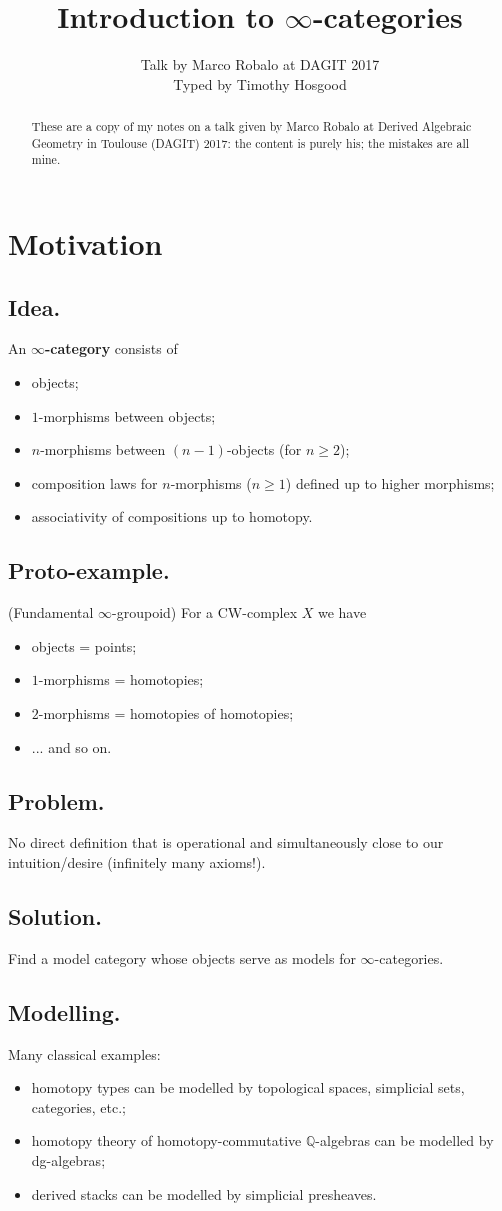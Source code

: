 \documentclass{article}
\title{Introduction to $\infty$-categories}
\author{Talk by Marco Robalo at DAGIT 2017\\Typed by Timothy Hosgood}
\date{\displaydate{date}}
\numberwithin{equation}{subsection}
\renewcommand{\ss}[1]{\subsection{#1}}
\begin{document}
    \maketitle

    \begin{abstract}
        These are a copy of my notes on a talk given by Marco Robalo at Derived Algebraic Geometry in Toulouse (DAGIT) 2017: the content is purely his; the mistakes are all mine.
    \end{abstract}

    \section{Motivation}

        \ss{Idea.}
            An \textbf{$\infty$-category} consists of
            \begin{itemize}
                \item objects;
                \item $1$-morphisms between objects;
                \item $n$-morphisms between $(n-1)$-objects (for $n\geqslant2$);
                \item composition laws for $n$-morphisms ($n\geqslant1$) defined up to higher morphisms;
                \item associativity of compositions up to homotopy.
            \end{itemize}

        \ss{Proto-example.} (Fundamental $\infty$-groupoid)
            For a CW-complex $X$ we have
            \begin{itemize}
                \item objects = points;
                \item $1$-morphisms = homotopies;
                \item $2$-morphisms = homotopies of homotopies;
                \item ... and so on.
            \end{itemize}

        \ss{Problem.}
            No direct definition that is operational and simultaneously close to our intuition/desire (infinitely many axioms!).

        \ss{Solution.}
            Find a model category whose objects serve as models for $\infty$-categories.

        \ss{Modelling.}
            Many classical examples:
            \begin{itemize}
                \item homotopy types can be modelled by topological spaces, simplicial sets, categories, etc.;
                \item homotopy theory of homotopy-commutative $\mathbb{Q}$-algebras can be modelled by dg-algebras;
                \item derived stacks can be modelled by simplicial presheaves.
            \end{itemize}
\end{document}
